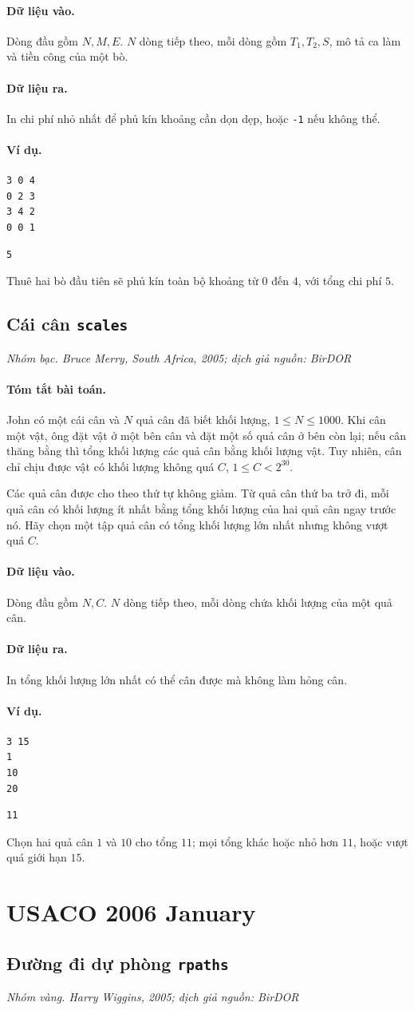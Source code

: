 \documentclass[11pt]{article}
\newcommand{\problem}[4]{%
  \subsection[#1 (#2)]{#1 \hfill {\normalsize\texttt{#2}}}%
  \noindent\textit{#3. #4}\par\smallskip
}
\newcommand{\iosec}[1]{\paragraph{#1}}
\begin{document}
\iosec{Dữ liệu vào.}
Dòng đầu gồm \(N,M,E\). \(N\) dòng tiếp theo, mỗi dòng gồm \(T_1,T_2,S\), mô
tả ca làm và tiền công của một bò.

\iosec{Dữ liệu ra.}
In chi phí nhỏ nhất để phủ kín khoảng cần dọn dẹp, hoặc \texttt{-1} nếu không
thể.

\iosec{Ví dụ.}
\begin{verbatim}
3 0 4
0 2 3
3 4 2
0 0 1
\end{verbatim}

\begin{verbatim}
5
\end{verbatim}

Thuê hai bò đầu tiên sẽ phủ kín toàn bộ khoảng từ \(0\) đến \(4\), với tổng
chi phí \(5\).

\problem{Cái cân}{scales}{Nhóm bạc}{Bruce Merry, South Africa, 2005; dịch giả nguồn: BirDOR}

\iosec{Tóm tắt bài toán.}
John có một cái cân và \(N\) quả cân đã biết khối lượng, \(1\le N\le 1000\).
Khi cân một vật, ông đặt vật ở một bên cân và đặt một số quả cân ở bên còn
lại; nếu cân thăng bằng thì tổng khối lượng các quả cân bằng khối lượng vật.
Tuy nhiên, cân chỉ chịu được vật có khối lượng không quá \(C\),
\(1\le C<2^{30}\).

Các quả cân được cho theo thứ tự không giảm. Từ quả cân thứ ba trở đi, mỗi
quả cân có khối lượng ít nhất bằng tổng khối lượng của hai quả cân ngay trước
nó. Hãy chọn một tập quả cân có tổng khối lượng lớn nhất nhưng không vượt quá
\(C\).

\iosec{Dữ liệu vào.}
Dòng đầu gồm \(N,C\). \(N\) dòng tiếp theo, mỗi dòng chứa khối lượng của một
quả cân.

\iosec{Dữ liệu ra.}
In tổng khối lượng lớn nhất có thể cân được mà không làm hỏng cân.

\iosec{Ví dụ.}
\begin{verbatim}
3 15
1
10
20
\end{verbatim}

\begin{verbatim}
11
\end{verbatim}

Chọn hai quả cân \(1\) và \(10\) cho tổng \(11\); mọi tổng khác hoặc nhỏ hơn
\(11\), hoặc vượt quá giới hạn \(15\).

\section{USACO 2006 January}

\problem{Đường đi dự phòng}{rpaths}{Nhóm vàng}{Harry Wiggins, 2005; dịch giả nguồn: BirDOR}
\end{document}

